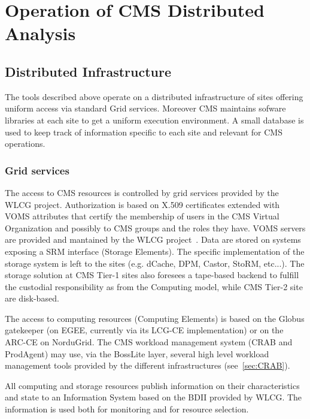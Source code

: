 \section{Operation of CMS Distributed Analysis}
\label{sec:4}
\subsection{Distributed Infrastructure}
\label{sec:4_1}
The tools described above operate on a distributed infrastructure
of sites offering uniform access via standard Grid services. Moreover CMS maintains sofware libraries at each site to get a uniform execution
environment. A small database is used to keep track of
information specific to each site and relevant for CMS operations.

\subsubsection{ Grid services }
\label{sec:4_1_1}

The access to CMS resources is controlled by grid services provided by the WLCG project.
Authorization is based on X.509 certificates extended with VOMS attributes
that certify the membership of users in the CMS Virtual Organization and possibly 
to CMS groups and the roles they have.
VOMS servers are provided and mantained by the WLCG project~\cite{RefWLCG}.
Data are stored on systems exposing a SRM interface (Storage Elements).
The specific implementation of the storage system is left to the sites
(e.g. dCache, DPM, Castor, StoRM, etc...). 
The storage solution at CMS Tier-1 sites also foresees a tape-based backend to fulfill 
the custodial responsibility as from the Computing model, while CMS Tier-2 site are disk-based.

The access to computing resources (Computing Elements) is based on
the Globus gatekeeper (on EGEE, currently via its LCG-CE implementation) or on the ARC-CE on NorduGrid.
The CMS workload management system (CRAB and ProdAgent) may use, via the BossLite layer,
several high level workload management tools provided by the different infrastructures
(see~\ref{sec:CRAB}).


All computing and storage resources publish information on their
characteristics and state to an Information System based
on the BDII provided by WLCG. The information is used both
for monitoring and for resource selection.

